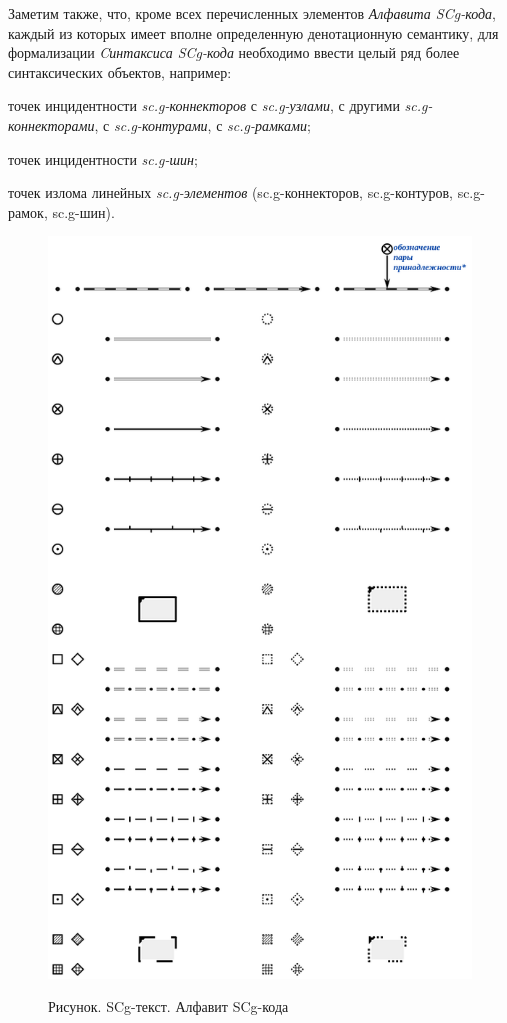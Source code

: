 Заметим также, что, кроме всех перечисленных элементов \textit{Алфавита SCg-кода\scnsupergroupsign}, каждый из которых имеет вполне определенную денотационную семантику, для формализации \textit{Cинтаксиса SCg-кода} необходимо ввести целый ряд более  синтаксических объектов, например:
\begin{textitemize}
	\item точек инцидентности \textit{sc.g-коннекторов} с \textit{sc.g-узлами}, с другими \textit{sc.g-коннекторами}, с \textit{sc.g-контурами}, с \textit{sc.g-рамками};
	\item точек инцидентности \textit{sc.g-шин};
	\item точек излома линейных \textit{sc.g-элементов} (sc.g-коннекторов, sc.g-контуров, sc.g-рамок, sc.g-шин).
\end{textitemize}

\begin{figure}[H]
	\centering
	\caption{Рисунок. SCg-текст. Алфавит SCg-кода\scnsupergroupsign}
	\includegraphics[scale=0.7]{images/intro/scg/SCg-full.png}
	\label{fig:scg_full}
\end{figure}

